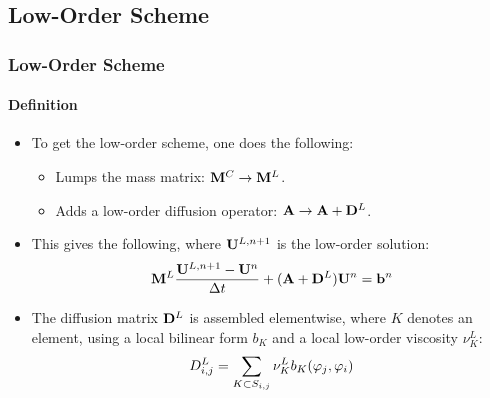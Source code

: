 \documentclass{beamer}
\begin{document}
\subsection{Low-Order Scheme}
\begin{frame}
\frametitle{Low-Order Scheme}
\framesubtitle{Definition}

\begin{itemize}
   \item To get the low-order scheme, one does the following:
   \begin{itemize}
      \item Lumps the mass matrix: $\mathbf{M}^C \rightarrow \mathbf{M}^L$.
      \item Adds a low-order diffusion operator: $\mathbf{A} \rightarrow \mathbf{A}+\mathbf{D}^L$.
   \end{itemize}
   \item This gives the following, where $\mathbf{U}^{L,n+1}$ is the low-order solution:
   \begin{equation}
      \mathbf{M}^L\frac{\mathbf{U}^{L,n+1}-\mathbf{U}^n}{\Delta t} + (\mathbf{A} + \mathbf{D}^L)\mathbf{U}^n = \mathbf{b}^n
   \end{equation}
   \item The diffusion matrix $\mathbf{D}^L$ is assembled elementwise, where $K$
      denotes an element, using a local bilinear form $b_K$ and a
      local low-order viscosity $\nu_K^L$:
   \begin{equation}
      D_{i,j}^L = \sum\limits_{K\subset S_{i,j}}\nu_K^L b_K(\varphi_j,\varphi_i)
   \end{equation}
\end{itemize}

\end{frame}
\end{document}
